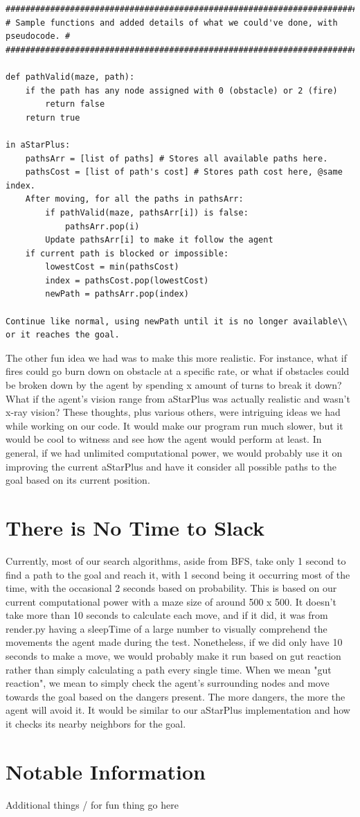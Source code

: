 \documentclass[11pt]{article}
\begin{document}
\begin{verbatim}
#################################################################################
# Sample functions and added details of what we could've done, with pseudocode. #
#################################################################################

def pathValid(maze, path):
    if the path has any node assigned with 0 (obstacle) or 2 (fire)
        return false
    return true

in aStarPlus:
    pathsArr = [list of paths] # Stores all available paths here.
    pathsCost = [list of path's cost] # Stores path cost here, @same index.
    After moving, for all the paths in pathsArr:
        if pathValid(maze, pathsArr[i]) is false:
            pathsArr.pop(i)
        Update pathsArr[i] to make it follow the agent
    if current path is blocked or impossible:
        lowestCost = min(pathsCost)
        index = pathsCost.pop(lowestCost)
        newPath = pathsArr.pop(index)
        
Continue like normal, using newPath until it is no longer available\\
or it reaches the goal.
\end{verbatim}
The other fun idea we had was to make this more realistic. For instance, what if fires could go burn down on obstacle at a specific rate, or what if obstacles could be broken down by the agent by spending x amount of turns to break it down? What if the agent's vision range from aStarPlus was actually realistic and wasn't x-ray vision? These thoughts, plus various others, were intriguing ideas we had while working on our code. It would make our program run much slower, but it would be cool to witness and see how the agent would perform at least.
In general, if we had unlimited computational power, we would probably use it on improving the current aStarPlus and have it consider all possible paths to the goal based on its current position.
	\pagebreak
\section{There is No Time to Slack}
Currently, most of our search algorithms, aside from BFS, take only 1 second to find a path to the goal and reach it, with 1 second being it occurring most of the time, with the occasional 2 seconds based on probability. This is based on our current computational power with a maze size of around 500 x 500. It doesn't take more than 10 seconds to calculate each move, and if it did, it was from render.py having a sleepTime of a large number to visually comprehend the movements the agent made during the test.
Nonetheless, if we did only have 10 seconds to make a move, we would probably make it run based on gut reaction rather than simply calculating a path every single time. When we mean "gut reaction", we mean to simply check the agent's surrounding nodes and move towards the goal based on the dangers present. The more dangers, the more the agent will avoid it. It would be similar to our aStarPlus implementation and how it checks its nearby neighbors for the goal.
	\pagebreak
\section{Notable Information}
Additional things / for fun thing go here
\end{document}
